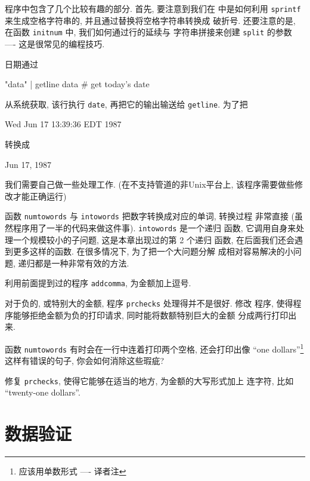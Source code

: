 程序中包含了几个比较有趣的部分. 首先, 要注意到我们在 \BEGIN 中是如何利用
\verb'sprintf' 来生成空格字符串的, 并且通过替换将空格字符串转换成
破折号. 还要注意的是, 在函数 \verb'initnum' 中, 我们如何通过行的延续与
字符串拼接来创建 \verb'split' 的参数 ---- 这是很常见的编程技巧.

日期通过
\begin{awkcode}
    "data" | getline data   # get today's date
\end{awkcode}
从系统获取, 该行执行 \verb'date', 再把它的输出输送给 \verb'getline'. 为了把
\begin{shell}
    Wed Jun 17 13:39:36 EDT 1987
\end{shell}
转换成 
\begin{shell}
    Jun 17, 1987
\end{shell}
我们需要自己做一些处理工作.
(在不支持管道的非Unix平台上, 该程序需要做些修改才能正确运行)

函数 \verb'numtowords' 与 \verb'intowords' 把数字转换成对应的单词, 转换过程
非常直接 (虽然程序用了一半的代码来做这件事). \verb'intowords' 是一个递归
函数, 它调用自身来处理一个规模较小的子问题, 这是本章出现过的第 2 个递归
函数, 在后面我们还会遇到更多这样的函数. 在很多情况下, 为了把一个大问题分解
成相对容易解决的小问题, 递归都是一种非常有效的方法.

\begin{exercise}
    利用前面提到过的程序 \verb'addcomma', 为金额加上逗号.
\end{exercise}

\begin{exercise}
    对于负的, 或特别大的金额, 程序 \verb'prchecks' 处理得并不是很好. 修改 
    程序, 使得程序能够拒绝金额为负的打印请求, 同时能将数额特别巨大的金额
    分成两行打印出来.
\end{exercise}

\begin{exercise}
    函数 \verb'numtowords' 有时会在一行中连着打印两个空格, 还会打印出像 
    ``one dollars''\footnote{应该用单数形式 ---- 译者注}
    这样有错误的句子, 你会如何消除这些瑕疵?
\end{exercise}

\begin{exercise}
    修复 \verb'prchecks', 使得它能够在适当的地方, 为金额的大写形式加上
    连字符, 比如 ``twenty-one dollars''.
\end{exercise}

\section{数据验证}
\label{sec:data_validation}

